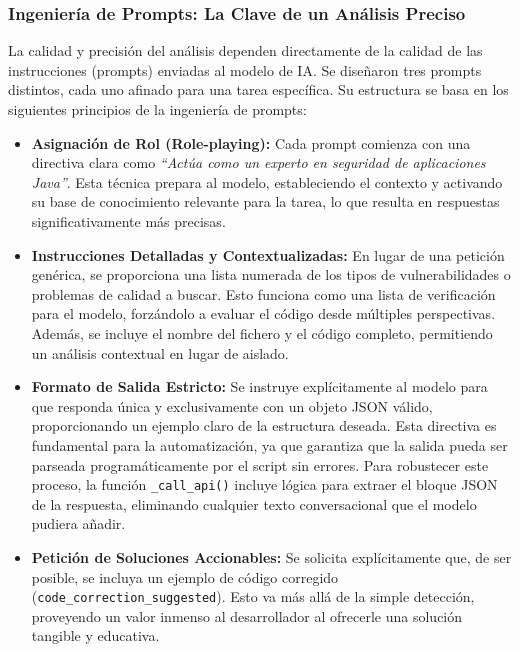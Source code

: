 \subsubsection{Ingeniería de Prompts: La Clave de un Análisis Preciso}

La calidad y precisión del análisis dependen directamente de la calidad de las instrucciones (prompts) enviadas al modelo de IA. Se diseñaron tres prompts distintos, cada uno afinado para una tarea específica. Su estructura se basa en los siguientes principios de la ingeniería de prompts:

\begin{itemize}
    \item \textbf{Asignación de Rol (Role-playing):} Cada prompt comienza con una directiva clara como \textit{``Actúa como un experto en seguridad de aplicaciones Java''}. Esta técnica prepara al modelo, estableciendo el contexto y activando su base de conocimiento relevante para la tarea, lo que resulta en respuestas significativamente más precisas.
    
    \item \textbf{Instrucciones Detalladas y Contextualizadas:} En lugar de una petición genérica, se proporciona una lista numerada de los tipos de vulnerabilidades o problemas de calidad a buscar. Esto funciona como una lista de verificación para el modelo, forzándolo a evaluar el código desde múltiples perspectivas. Además, se incluye el nombre del fichero y el código completo, permitiendo un análisis contextual en lugar de aislado.
    
    \item \textbf{Formato de Salida Estricto:} Se instruye explícitamente al modelo para que responda única y exclusivamente con un objeto JSON válido, proporcionando un ejemplo claro de la estructura deseada. Esta directiva es fundamental para la automatización, ya que garantiza que la salida pueda ser parseada programáticamente por el script sin errores. Para robustecer este proceso, la función \texttt{\_call\_api()} incluye lógica para extraer el bloque JSON de la respuesta, eliminando cualquier texto conversacional que el modelo pudiera añadir.
    
    \item \textbf{Petición de Soluciones Accionables:} Se solicita explícitamente que, de ser posible, se incluya un ejemplo de código corregido (\texttt{code\_correction\_suggested}). Esto va más allá de la simple detección, proveyendo un valor inmenso al desarrollador al ofrecerle una solución tangible y educativa.
\end{itemize}

